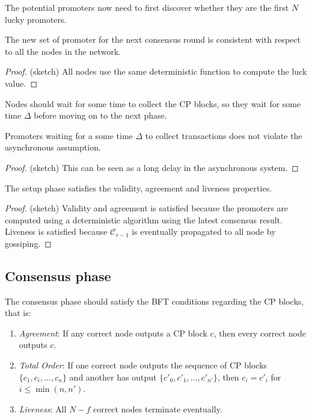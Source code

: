 The potential promoters now need to first discover whether
they are the first $N$ lucky promoters.

\begin{lemma}
  The new set of promoter for the next consensus round is consistent with
  respect to all the nodes in the network.
\end{lemma}
\begin{proof}
  (sketch) All nodes use the same deterministic function to compute the luck
  value.
\end{proof}

Nodes should wait for some time to collect the CP blocks, so they wait for some
time $\Delta$ before moving on to the next phase.

\begin{lemma}
  Promoters waiting for a some time $\Delta$ to collect transactions does not
  violate the asynchronous assumption.
\end{lemma}
\begin{proof}
  (sketch) This can be seen as a long delay in the asynchronous system.
\end{proof}

\begin{corollary}
  The setup phase satisfies the validity, agreement and liveness properties.
\end{corollary}
\begin{proof}
  (sketch) Validity and agreement is satisfied because the promoters are
  computed using a deterministic algorithm using the latest consensus result.
  Liveness is satisfied because $\mathcal{C}_{r-1}$ is eventually propagated to
  all node by gossiping.
\end{proof}

\subsection{Consensus phase}
The consensus phase should satisfy the BFT conditions regarding the CP blocks,
that is:
\begin{enumerate}
\item \emph{Agreement}: If any correct node outputs a CP block $c$, then every
  correct node outputs $c$.
\item \emph{Total Order}: If one correct node outputs the sequence of CP blocks
  $\{c_1, c_i, \dots, c_n\}$ and another has output $\{c'_0, c'_1, \dots,
  c'_{n'} \}$, then $c_i = c'_i$ for $i \le \min(n, n')$.
\item \emph{Liveness}: All $N - f$ correct nodes terminate eventually.
\end{enumerate}

